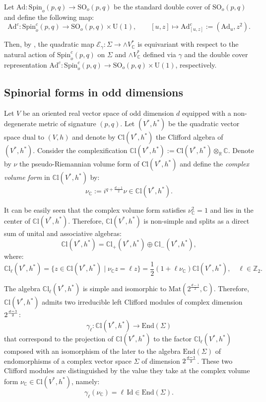 \documentclass[10pt,a4paper,twoside,reqno]{amsart}
\theoremstyle{plain}
\theoremstyle{definition}
\theoremstyle{remark}
\newcommand{\End}{\mathrm{End}}
\newcommand{\Mat}{\mathrm{Mat}}
\def\C{\mathbb{C}}
\def\R{\mathbb{R}}
\def\Ad{\mathrm{Ad}}
\def\Id{\mathrm{Id}}
\def\Spin{\mathrm{Spin}}
\def\Spin{\mathrm{Spin}}
\def\SO{\mathrm{SO}}
\def\U{\mathrm{U}}
\def\cE{\mathcal{E}}
\def\R{\mathbb{R}}
\def\mCl{\mathbb{C}\mathrm{l}}
\begin{document}
Let $\Ad\colon\Spin_o(p,q)\to\SO_o(p,q)$ be the standard double cover of $\SO_o(p,q)$ and define the following map: $$\Ad^c\colon \Spin_o^c(p,q) \to \SO_o(p,q) \times \U(1),\qquad [u,z]\mapsto \Ad^c_{[u,z]} := (\Ad_u,z^2).$$

Then, by \cite[Section 3.5]{Algebraic_Complex_Square_2025}, the quadratic map $\cE_\gamma \colon \Sigma \to \wedge V^*_\C$ is equivariant with respect to the natural action of $\Spin_o^c(p,q)$ on $\Sigma$ and $\wedge V^*_\C$ defined via $\gamma$ and the double cover representation $\Ad^c \colon \Spin_o^c(p,q) \to \SO_o(p,q)\times \U(1)$, respectively.


\subsection{Spinorial forms in odd dimensions}


Let $V$ be an oriented real vector space of odd dimension $d$ equipped with a non-degenerate metric of signature $(p,q)$. Let $(V^*,h^*)$ be the quadratic vector space dual to $(V,h)$ and denote by $\mathrm{Cl}(V^*,h^*)$ the Clifford algebra of $(V^*,h^*)$. Consider the complexification $\mCl(V^*,h^*) := \mathrm{Cl}(V^*,h^*) \otimes_\R\C$. Denote by $\nu$ the pseudo-Riemannian volume form of $\mathrm{Cl}(V^*,h^*)$ and define the \emph{complex volume form} in $\mCl(V^*,h^*)$ by: $$\nu_\C:=i^{q+\frac{d-1}{2}}\nu\in\mCl(V^*,h^*).$$

It can be easily seen that the complex volume form satisfies $\nu_\C^2=1$ and lies in the center of $\mCl(V^*,h^*)$. Therefore, $\mCl(V^*,h^*)$ is non-simple and splits as a direct sum of unital and associative algebras: \begin{equation}\label{eq:splitting_Clifford}
    \mCl(V^*,h^*)=\mCl_+(V^*,h^*)\oplus\mCl_-(V^*,h^*),
\end{equation} where: $$\mCl_\ell(V^*,h^*)=\{z\in\mCl(V^*,h^*)\mid\nu_\C z=\ell z\}=\frac{1}{2}(1+\ell\nu_\C)\mCl(V^*,h^*),\quad\ell\in\mathbb{Z}_2.$$

The algebra $\mCl_\ell(V^*,h^*)$ is simple and isomorphic to $\Mat(2^{\frac{d-1}{2}},\C)$. Therefore, $\mCl(V^*,h^*)$ admits two irreducible left Clifford modules of complex dimension $2^{\smash{\frac{d-1}{2}}}$: $$\gamma_\ell\colon\mCl(V^*,h^*)\to\End(\Sigma)$$ that correspond to the projection of $\mCl(V^*,h^*)$ to the factor $\mCl_\ell(V^*,h^*)$ composed with an isomorphism of the later to the algebra $\End(\Sigma)$ of endomorphisms of a complex vector space $\Sigma$ of dimension $2^{\smash{\frac{d-1}{2}}}$. These two Clifford modules are distinguished by the value they take at the complex volume form $\nu_\C\in\mCl(V^*,h^*)$, namely: $$\gamma_\ell(\nu_\C)=\ell\,\Id\in\End(\Sigma).$$
\end{document}
